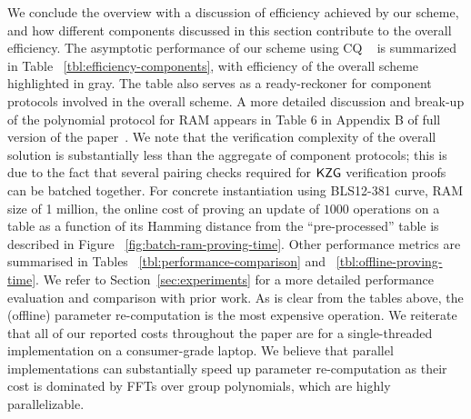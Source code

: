  We conclude the overview with a discussion of efficiency achieved by our scheme, and
how different components discussed in this section contribute to the overall efficiency. The asymptotic performance
of our scheme using CQ ~\cite{EPRINT:EagFioGab22} is summarized in Table ~\ref{tbl:efficiency-components}, with
efficiency of the overall scheme highlighted in gray. The table also serves as a ready-reckoner for component protocols
involved in the overall scheme. A more detailed discussion and break-up of the polynomial protocol for RAM
appears in Table 6 in Appendix B of full version of the paper~\cite{full-ver}. We note that the verification complexity of the overall solution is substantially
less than the aggregate of component protocols; this is due to the fact that several pairing checks required for
$\mathsf{KZG}$ verification proofs can be batched together. For concrete instantiation using BLS12-381 curve, RAM size
of 1 million, the online cost of proving an update of $1000$ operations on a table as a function of its
Hamming distance from the ``pre-processed'' table is described in Figure ~\ref{fig:batch-ram-proving-time}.
Other performance metrics are summarised in Tables ~\ref{tbl:performance-comparison} and ~\ref{tbl:offline-proving-time}.
We refer to Section~\ref{sec:experiments} for a more detailed performance evaluation and comparison with prior work.
As is clear from the tables above, the (offline) parameter re-computation is the most expensive operation.
We reiterate that all of our reported costs throughout the paper are for a single-threaded implementation on a consumer-grade laptop.
We believe that parallel implementations can
substantially speed up parameter re-computation as their cost is dominated by FFTs over group polynomials, which
are highly parallelizable.

\medskip

